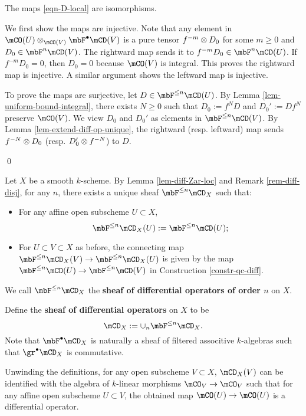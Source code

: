 	\begin{lem}
		\label{lem-diff-Zar-loc}
		The maps \eqref{eqn-D-local} are isomorphisms.
	\end{lem}

	\proof
		We first show the maps are injective. Note that any element in $\mCO(U) \ot_{\mCO(V)} \mbF^\bullet\mCD(V) $ is a pure tensor $f^{-m} \ot D_0$ for some $m\ge 0$ and $D_0 \in \mbF^n\mCD(V)$. The rightward map sends it to $f^{-m} D_0\in  \mbF^n\mCD(U)$. If $f^{-m} D_0=0$, then $D_0=0$ because $\mCO(V)$ is integral. This proves the rightward map is injective. A similar argument shows the leftward map is injective.

		To prove the maps are surjective, let $D\in  \mbF^{\le n}\mCD(U)$. By Lemma \ref{lem-uniform-bound-integral}, there exists $N\ge 0$ such that $D_0:=f^N D$ and $D_0':=D f^N$ preserve $\mCO(V)$. We view $D_0$ and $D_0'$ as elements in $\mbF^{\le n}\mCD(V)$. By Lemma \ref{lem-extend-diff-op-unique}, the rightward (resp. leftward) map sends $f^{-N}\ot D_0$ (resp. $D_0'\ot f^{-N}$) to $D$.

	\qed

	\begin{constr}
		Let $X$ be a smooth $k$-scheme. By Lemma \ref{lem-diff-Zar-loc} and Remark \ref{rem-diff-disj}, for any $n$, there exists a unique sheaf $\mbF^{\le n} \mCD_X$ such that:
		\begin{itemize}
			\item 
				For any affine open subscheme $U\subset X$,
				\[
					\mbF^{\le n} \mCD_X(U) := \mbF^{\le n} \mCD(U);
				\]
			\item
				For $U\subset V\subset X$ as before, the connecting map $\mbF^{\le n} \mCD_X(V) \to \mbF^{\le n} \mCD_X(U)$ is given by the map $\mbF^{\le n}  \mCD(U)\to \mbF^{\le n}  \mCD(V)$ in Construction \ref{constr-qc-diff}.
		\end{itemize}
		We call $\mbF^{\le n} \mCD_X$ the \textbf{sheaf of differential operators of order $n$} on $X$.

		Define the \textbf{sheaf of differential operators} on $X$ to be
		\[
			\mCD_X:= \cup_n \mbF^{\le n} \mCD_X.
		\]
		Note that $\mbF^\bullet\mCD_X$ is naturally a sheaf of filtered associtive $k$-algebras such that $\gr^\bullet \mCD_X$ is commutative.
	\end{constr}

	\begin{rem}
		Unwinding the definitions, for any open subscheme $V\subset X$, $\mCD_X(V)$ can be identified with the algebra of $k$-linear morphisms $\mCO_V \to \mCO_V$ such that for any affine open subscheme $U\subset V$, the obtained map $\mCO(U)\to \mCO(U)$ is a differential operator.

	\end{rem}

